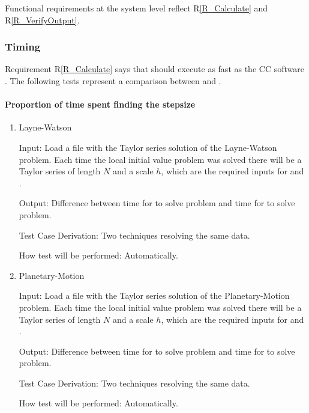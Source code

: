 \documentclass[12pt, titlepage]{article}
\newcommand{\rref}[1]{R\ref{#1}}
\begin{document}
Functional requirements at the system level reflect \rref{R_Calculate} and
\rref{R_VerifyOutput}.

\subsubsection{Timing}

Requirement \rref{R_Calculate} says that  should execute as fast as
the CC software \rdcon. The following tests represent a comparison between
 and \rdcon.

\paragraph{Proportion of time spent finding the stepsize}

\begin{enumerate}

\item{Layne-Watson\\}

					
					
Input: Load a file with the Taylor series solution of the Layne-Watson problem. Each time the
    local initial value problem was solved there will be a Taylor series of length $N$ and a scale $h$,
    which are the required inputs for  and \rdcon.
					
Output: Difference between time for  to solve problem and time for \rdcon to solve problem.

Test Case Derivation: Two techniques resolving the same data.
					
How test will be performed: Automatically.
					
\item{Planetary-Motion\\}

					
					
Input: Load a file with the Taylor series solution of the Planetary-Motion problem. Each time the
    local initial value problem was solved there will be a Taylor series of length $N$ and a scale $h$,
    which are the required inputs for  and \rdcon.
					
Output: Difference between time for  to solve problem and time for \rdcon to solve problem.

Test Case Derivation: Two techniques resolving the same data.
					
How test will be performed: Automatically.

\end{enumerate}
\end{document}
